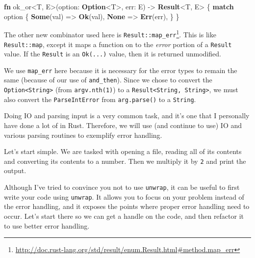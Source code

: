 \documentclass[a4paper,]{book}
\newenvironment{Shaded}{\begin{snugshade}}{\end{snugshade}}
\newcommand{\KeywordTok}[1]{\textcolor[rgb]{0.13,0.29,0.53}{\textbf{{#1}}}}
\newcommand{\NormalTok}[1]{{#1}}
\renewcommand{\href}[2]{#2\footnote{\url{#1}}}
\begin{document}
\begin{Shaded}
\begin{Highlighting}[]
\KeywordTok{fn} \NormalTok{ok_or<T, E>(option: }\KeywordTok{Option}\NormalTok{<T>, err: E) -> }\KeywordTok{Result}\NormalTok{<T, E> \{}
    \KeywordTok{match} \NormalTok{option \{}
        \KeywordTok{Some}\NormalTok{(val) => }\KeywordTok{Ok}\NormalTok{(val),}
        \KeywordTok{None} \NormalTok{=> }\KeywordTok{Err}\NormalTok{(err),}
    \NormalTok{\}}
\NormalTok{\}}
\end{Highlighting}
\end{Shaded}

The other new combinator used here is
\href{http://doc.rust-lang.org/std/result/enum.Result.html\#method.map_err}{\texttt{Result::map\_err}}.
This is like \texttt{Result::map}, except it maps a function on to the
\emph{error} portion of a \texttt{Result} value. If the \texttt{Result}
is an \texttt{Ok(...)} value, then it is returned unmodified.

We use \texttt{map\_err} here because it is necessary for the error
types to remain the same (because of our use of \texttt{and\_then}).
Since we chose to convert the
\texttt{Option\textless{}String\textgreater{}} (from
\texttt{argv.nth(1)}) to a
\texttt{Result\textless{}String,\ String\textgreater{}}, we must also
convert the \texttt{ParseIntError} from \texttt{arg.parse()} to a
\texttt{String}.


Doing IO and parsing input is a very common task, and it's one that I
personally have done a lot of in Rust. Therefore, we will use (and
continue to use) IO and various parsing routines to exemplify error
handling.

Let's start simple. We are tasked with opening a file, reading all of
its contents and converting its contents to a number. Then we multiply
it by \texttt{2} and print the output.

Although I've tried to convince you not to use \texttt{unwrap}, it can
be useful to first write your code using \texttt{unwrap}. It allows you
to focus on your problem instead of the error handling, and it exposes
the points where proper error handling need to occur. Let's start there
so we can get a handle on the code, and then refactor it to use better
error handling.
\end{document}
